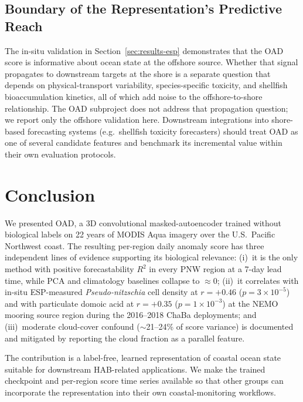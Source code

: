 \documentclass[toxins,article,submit,moreauthors]{Definitions/mdpi}
\begin{document}
\subsection{Boundary of the Representation's Predictive Reach}
\label{sec:discussion-boundary}

The in-situ validation in Section~\ref{sec:results-esp} demonstrates that the OAD score is informative about ocean state at the offshore source. Whether that signal propagates to downstream targets at the shore is a separate question that depends on physical-transport variability, species-specific toxicity, and shellfish bioaccumulation kinetics, all of which add noise to the offshore-to-shore relationship. The OAD subproject does not address that propagation question; we report only the offshore validation here. Downstream integrations into shore-based forecasting systems (e.g.\ shellfish toxicity forecasters) should treat OAD as one of several candidate features and benchmark its incremental value within their own evaluation protocols.

\section{Conclusion}
\label{sec:conclusion}

We presented OAD, a 3D convolutional masked-autoencoder trained without biological labels on 22 years of MODIS Aqua imagery over the U.S.\ Pacific Northwest coast. The resulting per-region daily anomaly score has three independent lines of evidence supporting its biological relevance: (i)~it is the only method with positive forecastability $R^2$ in every PNW region at a 7-day lead time, while PCA and climatology baselines collapse to $\approx 0$; (ii)~it correlates with in-situ ESP-measured \textit{Pseudo-nitzschia} cell density at $r = +0.46$ ($p = 3 \times 10^{-5}$) and with particulate domoic acid at $r = +0.35$ ($p = 1 \times 10^{-3}$) at the NEMO mooring source region during the 2016--2018 ChaBa deployments; and (iii)~moderate cloud-cover confound ($\sim$21--24\% of score variance) is documented and mitigated by reporting the cloud fraction as a parallel feature.

The contribution is a label-free, learned representation of coastal ocean state suitable for downstream HAB-related applications. We make the trained checkpoint and per-region score time series available so that other groups can incorporate the representation into their own coastal-monitoring workflows.
\end{document}
